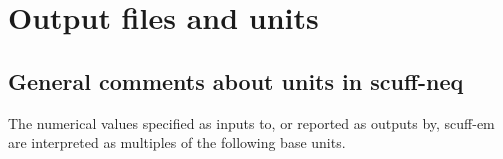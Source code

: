 \documentclass[letterpaper]{article}
\begin{document}

\newpage
\section{Output files and units}

\subsection{General comments about units in {\sc scuff-neq}}

The numerical values specified as inputs to, or reported
as outputs by, {\sc scuff-em} are interpreted as multiples
of the following base units.
\end{document}
